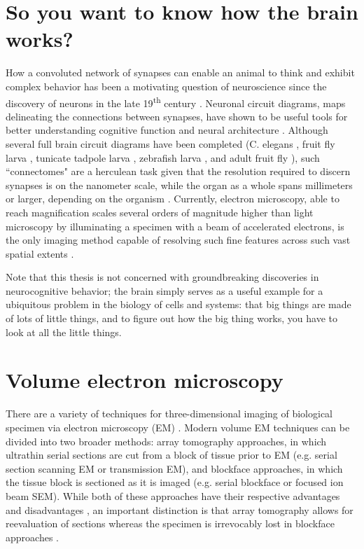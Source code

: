 \section{So you want to know how the brain works?}
\label{sec:1_brain}

How a convoluted network of synapses can enable an animal to think and exhibit complex behavior has been a motivating question of neuroscience since the discovery of neurons in the late 19\textsuperscript{th} century \cite{ramon1899textura, finger2001origins}. Neuronal circuit diagrams, maps delineating the connections between synapses, have shown to be useful tools for better understanding cognitive function and neural architecture \cite{helmstaedter20083d, kasthuri2015saturated}. Although several full brain circuit diagrams have been completed (C. elegans \cite{white1986structure}, fruit fly larva \cite{ohyama2015multilevel}, tunicate tadpole larva \cite{ryan2016cns}, zebrafish larva \cite{hildebrand2017whole}, and adult fruit fly \cite{zheng2018complete}), such ``connectomes" are a herculean task given that the resolution required to discern synapses is on the nanometer scale, while the organ as a whole spans millimeters or larger, depending on the organism \cite{lichtman2008ome, bock2011network, kornfeld2018progress}. Currently, electron microscopy, able to reach magnification scales several orders of magnitude higher than light microscopy by illuminating a specimen with a beam of accelerated electrons, is the only imaging method capable of resolving such fine features across such vast spatial extents \cite{helmstaedter20083d, zheng2018complete}.

Note that this thesis is not concerned with groundbreaking discoveries in neurocognitive behavior; the brain simply serves as a useful example for a ubiquitous problem in the biology of cells and systems: that big things are made of lots of little things, and to figure out how the big thing works, you have to look at all the little things.


\section{Volume electron microscopy}
\label{sec:1_vEM}

There are a variety of techniques for three-dimensional imaging of biological specimen via electron microscopy (EM) \cite{peddie2014exploring}. Modern volume EM techniques can be divided into two broader methods: array tomography approaches, in which ultrathin serial sections are cut from a block of tissue prior to EM (e.g. serial section scanning EM or transmission EM), and blockface approaches, in which the tissue block is sectioned as it is imaged (e.g. serial blockface or focused ion beam SEM). While both of these approaches have their respective advantages and disadvantages \cite{briggman2012volume, peddie2014exploring}, an important distinction is that array tomography allows for reevaluation of sections whereas the specimen is irrevocably lost in blockface approaches \cite{schifferer2021niwaki}.

